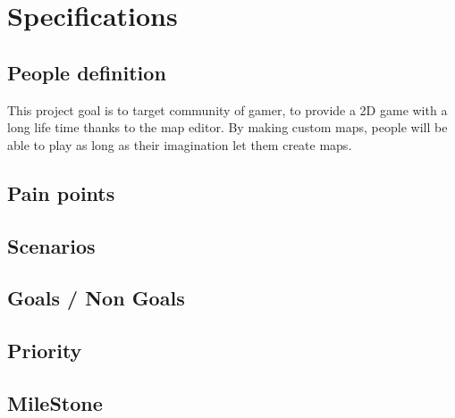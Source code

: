 \newpage
\thispagestyle{empty}

\chapter{Specifications}

\section{People definition}

This project goal is to target community of gamer, to provide a 2D game with a long life time thanks to the map editor. By making custom maps, people will be able to play as long as their imagination let them create maps.

\section{Pain points}
\section{Scenarios}
\section{Goals / Non Goals}
\section{Priority}
\section{MileStone}
